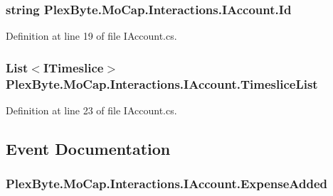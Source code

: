 \subsubsection[{\texorpdfstring{Id}{Id}}]{\setlength{\rightskip}{0pt plus 5cm}string Plex\+Byte.\+Mo\+Cap.\+Interactions.\+I\+Account.\+Id\hspace{0.3cm}{\ttfamily [get]}}\hypertarget{interface_plex_byte_1_1_mo_cap_1_1_interactions_1_1_i_account_a5f3422d283ccd4a4913fcba8863fe675}{}\label{interface_plex_byte_1_1_mo_cap_1_1_interactions_1_1_i_account_a5f3422d283ccd4a4913fcba8863fe675}


Definition at line 19 of file I\+Account.\+cs.

\subsubsection[{\texorpdfstring{Timeslice\+List}{TimesliceList}}]{\setlength{\rightskip}{0pt plus 5cm}List$<${\bf I\+Timeslice}$>$ Plex\+Byte.\+Mo\+Cap.\+Interactions.\+I\+Account.\+Timeslice\+List\hspace{0.3cm}{\ttfamily [get]}}\hypertarget{interface_plex_byte_1_1_mo_cap_1_1_interactions_1_1_i_account_a34e6de5df73fd44aa61cfd2492660ed0}{}\label{interface_plex_byte_1_1_mo_cap_1_1_interactions_1_1_i_account_a34e6de5df73fd44aa61cfd2492660ed0}


Definition at line 23 of file I\+Account.\+cs.



\subsection{Event Documentation}
\subsubsection[{\texorpdfstring{Expense\+Added}{ExpenseAdded}}]{ Plex\+Byte.\+Mo\+Cap.\+Interactions.\+I\+Account.\+Expense\+Added}\hypertarget{interface_plex_byte_1_1_mo_cap_1_1_interactions_1_1_i_account_a47d037273f3fb8a3a17581b2c243226a}{}\label{interface_plex_byte_1_1_mo_cap_1_1_interactions_1_1_i_account_a47d037273f3fb8a3a17581b2c243226a}


